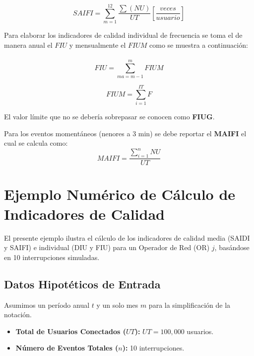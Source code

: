 \documentclass[a5paper]{book}%
\begin{document}
    \[ SAIFI  = \sum_{m=1}^{12}\dfrac{\sum(NU)}{UT}   \left[  \dfrac{veces}{usuario} \right]  \]

    Para elaborar los indicadores de calidad  individual de frecuencia se toma el de manera anual el $FIU$ y mensualmente el $FIUM$ como se muestra a continuación:\\\\

    \[  FIU = \sum_{ma=m-1}^{m} FIUM \]

    \[ FIUM = \sum_{i=1}^{IT} F\]

    El  valor límite que no se debería sobrepasar se conocen como  \textbf{FIUG}.

    Para los eventos momentáneos (nenores a 3 min) se debe reportar el \textbf{MAIFI} el cual se calcula como:
    \[ MAIFI = \dfrac{\sum_{i=1}^{n}NU }{UT}\]
    
    \section*{Ejemplo Numérico de Cálculo de Indicadores de Calidad}
    
    El presente ejemplo ilustra el cálculo de los indicadores de calidad media (SAIDI y SAIFI) e individual (DIU y FIU) para un Operador de Red (OR) $j$, basándose en 10 interrupciones simuladas.
    
    \subsection*{Datos Hipotéticos de Entrada}
    Asumimos un período anual $t$ y un solo mes $m$ para la simplificación de la notación.
    
    \begin{itemize}
    	\item \textbf{Total de Usuarios Conectados ($UT$):} $UT = 100,000$ usuarios.
    	\item \textbf{Número de Eventos Totales ($n$):} 10 interrupciones.
    \end{itemize}
    
\end{document}
